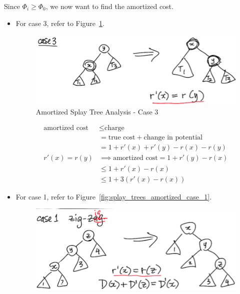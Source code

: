                 Since $\Phi_i \ge \Phi_0$, we now want to find the amortized cost.

                \begin{itemize}
                    \item For case 3, refer to Figure~\ref{fig:splay_trees_amortized_case_3}.
                        \begin{figure}[h]
                            \centering
                            \includegraphics{images/splay_trees_amortized_case_3.png}
                            \caption{Amortized Splay Tree Analysis - Case 3}
                            \label{fig:splay_trees_amortized_case_3}
                        \end{figure}
                        \begin{align*}
                            \text{amortized cost} &\le \text{charge} \\
                            &= \text{true cost} + \text{change in potential} \\
                            &= 1 + r'(x) + r'(y) - r(x) - r(y) \\
                            r'(x) = r(y) &\implies \text{amortized cost} = 1 + r'(y) - r(x) \\
                            &\le 1 + r'(x) - r(x) \\
                            &\le 1 + 3(r'(x) - r(x))
                        \end{align*}
                    \item For case 1, refer to Figure~\ref{fig:splay_trees_amortized_case_1}.
                        \begin{figure}[h]
                            \centering
                            \includegraphics{images/splay_trees_amortized_case_1.png}

\end{figure}
\end{itemize}
